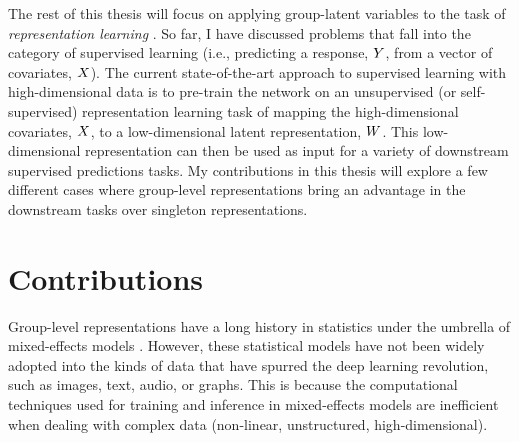 \documentclass[../thesis.tex]{subfiles}
\begin{document}
The rest of this thesis will focus on applying group-latent variables to the task of \textit{representation learning} \citep{bengioRepresentationLearningReview2014}. So far, I have discussed problems that fall into the category of supervised learning (i.e., predicting a response, $\myrv{y}$, from a vector of covariates, $\myrv{x}$). The current state-of-the-art approach to supervised learning with high-dimensional data is to pre-train the network on an unsupervised (or self-supervised) representation learning task of mapping the high-dimensional covariates, $\myrv{x}$, to a low-dimensional latent representation, $\myrv{w}$. This low-dimensional representation can then be used as input for a variety of downstream supervised predictions tasks. My contributions in this thesis will explore a few different cases where group-level representations bring an advantage in the downstream tasks over singleton representations.  

\section{Contributions} 

Group-level representations have a long history in statistics under the umbrella of mixed-effects models \citep{pinheiroMixedEffectsModelsSPLUS2001}. However, these statistical models have not been widely adopted into the kinds of data that have spurred the deep learning revolution, such as images, text, audio, or graphs. This is because the computational techniques used for training and inference in mixed-effects models are inefficient when dealing with complex data (non-linear, unstructured, high-dimensional). 


\end{document}
